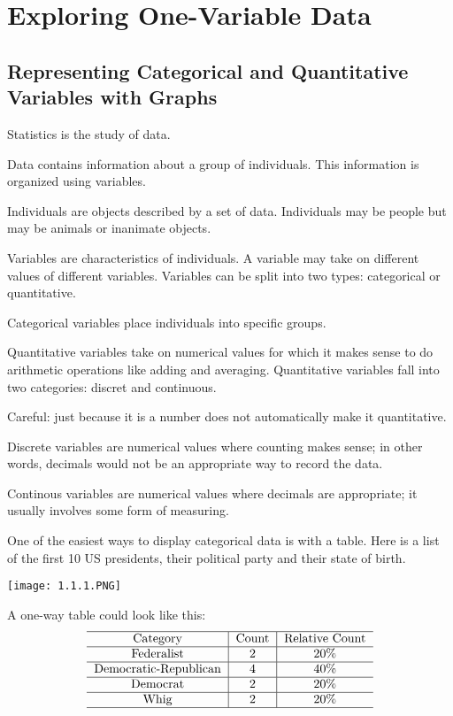 \documentclass[../stats.tex]{subfiles}
\begin{document}
\chapter{Exploring One-Variable Data}
\section{Representing Categorical and Quantitative Variables with Graphs}
Statistics is the study of data.

Data contains information about a group of individuals. This information is organized using variables.

Individuals are objects described by a set of data. Individuals may be people but may be animals or inanimate objects.

Variables are characteristics of individuals. A variable may take on different values of different variables. Variables can be split into two types: categorical or quantitative.

Categorical variables place individuals into specific groups.

Quantitative variables take on numerical values for which it makes sense to do arithmetic operations like adding and averaging. Quantitative variables fall into two categories: discret and continuous.

Careful: just because it is a number does not automatically make it quantitative.

Discrete variables are numerical values where counting makes sense; in other words, decimals would not be an appropriate way to record the data.

Continous variables are numerical values where decimals are appropriate; it usually involves some form of measuring.

One of the easiest ways to display categorical data is with a table. Here is a list of the first 10 US presidents, their political party and their state of birth.
\begin{center}
    \texttt{[image: 1.1.1.PNG]}
\end{center}

A one-way table could look like this:
\[ \begin{tabular}{c|c|c}
    \hline
    Category & Count & Relative Count\\\hline
    Federalist & 2 & 20\%\\\hline
    Democratic-Republican & 4 & 40\% \\\hline
    Democrat & 2 & 20\% \\\hline
    Whig & 2 & 20\% \\\hline
\end{tabular}\]
\end{document}
